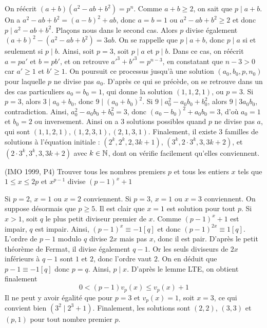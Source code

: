 \begin{sol}
On réécrit $(a+b)(a^2-ab+b^2)=p^n$. Comme $a+b\ge 2$, on sait que $p\mid a+b$. On a $a^2-ab+b^2=(a-b)^2+ab$, donc $a=b=1$ ou $a^2-ab+b^2\ge 2$ et donc $p\mid a^2-ab+b^2$. Plaçons nous dans le second cas. Alors $p$ divise également $(a+b)^2-(a^2-ab+b^2)=3ab$. On se rappelle que $p\mid a+b$, donc $p\mid a$ si et seulement si $p\mid b$.
Ainsi, soit $p=3$, soit $p\mid a$ et $p\mid b$. Dans ce cas, on réécrit $a=pa'$ et $b=pb'$, et on retrouve $a'^3+b'^3=p^{n -3}$, en constatant que $n-3>0$ car $a'\ge 1$ et $b'\ge 1$. On poursuit ce processus jusqu'à une solution $(a_0,b_0,p,n_0)$ pour laquelle $p$ ne divise pas $a_0$. D'après ce qui se précède, on se retrouve dans un des cas particuliers $a_0=b_0=1$, qui donne la solution $(1,1,2,1)$, ou $p=3$. Si $p=3$, alors $3\mid a_0+b_0$, donc $9\mid (a_0+b_0)^2$. Si $9\mid a_0^2-a_0b_0+b_0^2$, alors $9\mid 3a_0b_0$, contradiction. Ainsi, $a_0^2-a_0b_0+b_0^2=3$, donc $(a_0-b_0)^2+a_0b_0=3$, d'où $a_0=1$ et $b_0=2$ ou inversement.
\newline Ainsi on a $3$ solutions possibles quand $p$ ne divise pas $a$, qui sont $(1,1,2,1),(1,2,3,1),(2,1,3,1)$. Finalement, il existe $3$ familles de solutions à l'équation initiale : $(2^k,2^k,2,3k+1)$, $(3^k,2\cdot 3^k,3,3k+2)$, et $(2\cdot 3^k,3^k,3,3k+2)$ avec $k\in\mathbb N$, dont on vérifie facilement qu'elles conviennent.
\end{sol}


\begin{exo}
(IMO 1999, P4) Trouver tous les nombres premiers $p$ et tous les entiers $x$ tels que $1\leq x\leq 2p$ et $x^{p-1}$ divise $(p-1)^x+1$
\end{exo}


\begin{sol}
Si $p=2$, $x=1$ ou $x=2$ conviennent. Si $p=3$, $x=1$ ou $x=3$ conviennent. On suppose désormais que $p\geq 5$. Il est clair que $x=1$ est solution pour tout $p$. Si $x>1$, soit $q$ le plus petit diviseur premier de $x$. Comme $(p-1)^x+1$ est impair, $q$ est impair. Ainsi, $(p-1)^x\equiv -1[q]$ et donc $(p-1)^{2x}\equiv 1[q]$. L'ordre de $p-1$ modulo $q$ divise $2x$ mais pas $x$, donc il est pair. D'après le petit théorème de Fermat, il divise également $q-1$. Or les seuls diviseurs de $2x$ inférieurs à $q-1$ sont $1$ et $2$, donc l'ordre vaut $2$. On en déduit que $p-1\equiv -1[q]$ donc $p=q$.
Ainsi, $p\mid x$. D'après le lemme LTE, on obtient finalement
$$0<(p-1)v_p(x)\leq v_p(x)+1$$
Il ne peut y avoir égalité que pour $p=3$ et $v_p(x)=1$, soit $x=3$, ce qui convient bien $(3^2\mid 2^3+1)$. Finalement, les solutions sont $(2,2)$, $(3,3)$ et $(p,1)$ pour tout nombre premier $p$.
\end{sol}